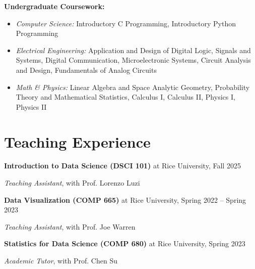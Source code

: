 \documentclass[11pt]{article}
\begin{document}
\vspace{\lineskip}

\textbf{Undergraduate Coursework:}

\begin{itemize}
    \item {\textit{Computer Science:}} Introductory C Programming, Introductory Python Programming
    \item {\textit{Electrical Engineering:}} Application and Design of Digital Logic, Signals and Systems, Digital Communication, Microelectronic Systems, Circuit Analysis and Design, Fundamentals of Analog Circuits
    \item {\textit{Math \& Physics:}} Linear Algebra and Space Analytic Geometry, Probability Theory and Mathematical Statistics, Calculus I, Calculus II, Physics I, Physics II
\end{itemize}

\section*{Teaching Experience}

\textbf{Introduction to Data Science (DSCI 101)} at Rice University, \hfill Fall 2025

\textit{Teaching Assistant}, with Prof. Lorenzo Luzi

\vspace{\lineskip}

\textbf{Data Visualization (COMP 665)} at Rice University, \hfill Spring 2022 -- Spring 2023

\textit{Teaching Assistant}, with Prof. Joe Warren

\vspace{\lineskip}

\textbf{Statistics for Data Science (COMP 680)} at Rice University, \hfill Spring 2023

\textit{Academic Tutor}, with Prof. Chen Su
\end{document}
